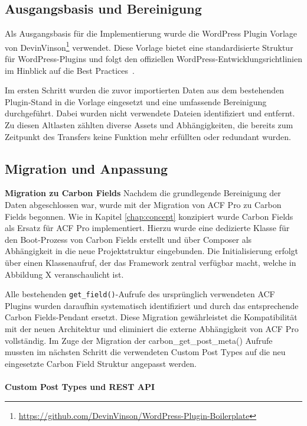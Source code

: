 \subsection{Ausgangsbasis und Bereinigung}

Als Ausgangsbasis für die Implementierung wurde die WordPress Plugin Vorlage von DevinVinson\footnote{\url{https://github.com/DevinVinson/WordPress-Plugin-Boilerplate}} verwendet.
Diese Vorlage bietet eine standardisierte Struktur für WordPress-Plugins und folgt den offiziellen WordPress-Entwicklungsrichtlinien im Hinblick auf die Best Practices~\cite{wordpress2025BSP}.

Im ersten Schritt wurden die zuvor importierten Daten aus dem bestehenden Plugin-Stand in die Vorlage eingesetzt und eine umfassende Bereinigung durchgeführt.
Dabei wurden nicht verwendete Dateien identifiziert und entfernt.
Zu diesen Altlasten zählten diverse Assets und Abhängigkeiten, die bereits zum Zeitpunkt des Transfers keine Funktion mehr erfüllten oder redundant wurden.
\subsection{Migration und Anpassung}
\textbf{Migration zu Carbon Fields}
Nachdem die grundlegende Bereinigung der Daten abgeschlossen war, wurde mit der Migration von ACF Pro zu Carbon Fields begonnen.
Wie in Kapitel \ref{chap:concept} konzipiert wurde Carbon Fields als Ersatz für ACF Pro implementiert.
Hierzu wurde eine dedizierte Klasse für den Boot-Prozess von Carbon Fields erstellt und über Composer als Abhängigkeit in die neue Projektstruktur eingebunden.
Die Initialisierung erfolgt über einen Klassenaufruf, der das Framework zentral verfügbar macht, welche in Abbildung X veranschaulicht ist. %

Alle bestehenden \texttt{get\_field()}-Aufrufe des ursprünglich verwendeten ACF Plugins wurden daraufhin systematisch identifiziert und durch das entsprechende Carbon Fields-Pendant ersetzt.
Diese Migration gewährleistet die Kompatibilität mit der neuen Architektur und eliminiert die externe Abhängigkeit von ACF Pro vollständig.
Im Zuge der Migration der carbon_get_post_meta() Aufrufe mussten im nächsten Schritt die verwendeten Custom Post Types auf die neu eingesetzte Carbon Field Struktur angepasst werden.
\\\\
\textbf{Custom Post Types und REST API}

